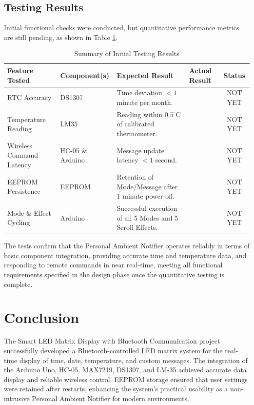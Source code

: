 \documentclass[a4paper, 10pt]{article}
\begin{document}
	\subsection{Testing Results}
	Initial functional checks were conducted, but quantitative performance metrics are still pending, as shown in Table \ref{tab:testing_results}.
	
	\begin{table}[htbp]
		\centering
		\caption{Summary of Initial Testing Results}
		\begin{tabular}{@{}p{3.5cm}p{2.5cm}p{3.5cm}p{3cm}c@{}}
			\toprule
			\textbf{Feature Tested} & \textbf{Component(s)} & \textbf{Expected Result} & \textbf{Actual Result} & \textbf{Status} \\
			\midrule
			RTC Accuracy & DS1307 & Time deviation $< 1$ minute per month. & \textit{} & NOT YET \\
			Temperature Reading & LM35 & Reading within $0.5^\circ\text{C}$ of calibrated thermometer. & \textit{} & NOT YET \\
			Wireless Command Latency & HC-05 \& Arduino & Message update latency $< 1$ second. & \textit{} & NOT YET \\
			EEPROM Persistence & EEPROM & Retention of Mode/Message after 1 minute power-off. & \textit{} & NOT YET \\
			Mode \& Effect Cycling & Arduino & Successful execution of all 5 Modes and 5 Scroll Effects. & \textit{} & NOT YET \\
			\bottomrule
		\end{tabular}
		\label{tab:testing_results}
	\end{table}
	
	The tests confirm that the Personal Ambient Notifier operates reliably in terms of basic component integration, providing accurate time and temperature data, and responding to remote commands in near real-time, meeting all functional requirements specified in the design phase once the quantitative testing is complete.
	
	\section{Conclusion}
	The Smart LED Matrix Display with Bluetooth Communication project successfully developed a Bluetooth-controlled LED matrix system for the real-time display of time, date, temperature, and custom messages. The integration of the Arduino Uno, HC-05, MAX7219, DS1307, and LM-35 achieved accurate data display and reliable wireless control. EEPROM storage ensured that user settings were retained after restarts, enhancing the system's practical usability as a non-intrusive Personal Ambient Notifier for modern environments.
	
\end{document}
